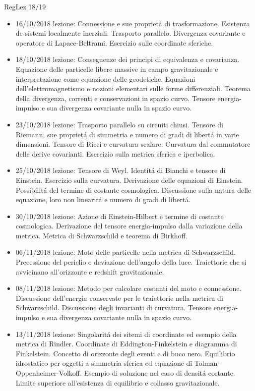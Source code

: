 \begin{frame}[allowframebreaks]{RegLez 18/19}
\begin{itemize}
\item 16/10/2018 lezione: Connessione e sue propriet\'a di trasformazione. Esistenza de sistemi localmente inerziali. Trasporto parallelo. Divergenza covariante e operatore di Lapace-Beltrami. Esercizio sulle coordinate sferiche.
\item 18/10/2018 lezione: Conseguenze dei principi di equivalenza e covarianza. Equazione delle particelle libere massive in campo gravitazionale e interpretazione come equazione delle geodetiche. Equazioni dell'elettromagnetismo e nozioni elementari sulle forme differenziali. Teorema della divergenza, correnti e conservazioni in spazio curvo. Tensore energia-impulso e sua divergenza covariante nulla in spazio curvo.
\item 23/10/2018 lezione: Trasporto parallelo su circuiti chiusi. Tensore di Riemann, sue propriet\'a di simmetria e numero di gradi di libert\'a in varie dimensioni. Tensore di Ricci e curvatura scalare. Curvatura dal commutatore delle derive covarianti. Esercizio sulla metrica sferica e iperbolica.
\item 25/10/2018 lezione: Tensore di Weyl. Identit\'a di Bianchi e tensore di Einstein. Esercizio sulla curvatura. Derivazione delle equazioni di Einstein. Possibilit\'a del termine di costante cosmologica. Discussione sulla natura delle equazione, loro non linearit\'a e numero di gradi di libert\'a.
\item 30/10/2018 lezione: Azione di Einstein-Hilbert e termine di costante cosmologica. Derivazione del tensore energia-impulso dalla variazione della metrica. Metrica di Schwarzschild e teorema di Birkhoff.
\item 06/11/2018 lezione: Moto delle particelle nella metrica di Schwarzschild. Precessione del perielio e deviazione dell'angolo della luce. Traiettorie che si avvicinano all'orizzonte e redshift gravitazionale.
\item 08/11/2018 lezione: Metodo per calcolare costanti del moto e connessione. Discussione dell'energia conservate per le traiettorie nella metrica di Schwarzschild. Discussione degli invarianti di curvatura. Tensore energia-impulso e sua divergenza covariante nulla in spazio curvo.
\item 13/11/2018 lezione: Singolarit\'a dei sitemi di coordinate ed esempio della metrica di Rindler. Coordinate di Eddington-Finkelstein e diagramma di Finkelstein. Concetto di orizzonte degli eventi e di buco nero. Equilibrio idrostatico per oggetti a simmetria sferica ed equazione di Tolman-Oppenheimer-Volkoff. Esempio di soluzione nel caso di densit\'a costante. Limite superiore all'esistenza di equilibrio e collasso gravitazionale.

\end{itemize}
\end{frame}

